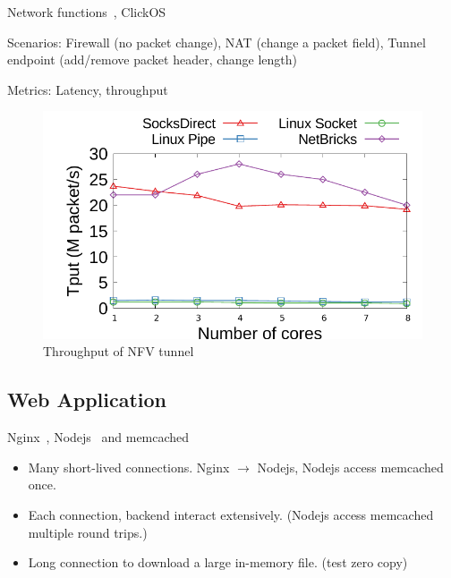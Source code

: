 Network functions~\cite{li2016clicknp}, ClickOS~\cite{martins2014clickos}

Scenarios: Firewall (no packet change), NAT (change a packet field), Tunnel endpoint (add/remove packet header, change length)

Metrics: Latency, throughput

\begin{figure}[htpb]
	\centering
	\includegraphics[width=\columnwidth]{eval/microbenchmark/nfv-tun-tput.pdf}
	\caption{Throughput of NFV tunnel}
	\label{fig:eval-tun-tput}
\end{figure}



\subsection{Web Application}

Nginx~\cite{nginx}, Nodejs~\cite{nodejs} and memcached~\cite{memcached}

\begin{itemize}
	\item Many short-lived connections. Nginx $\rightarrow$ Nodejs, Nodejs access memcached once.
	\item Each connection, backend interact extensively. (Nodejs access memcached multiple round trips.)
	\item Long connection to download a large in-memory file. (test zero copy)
\end{itemize}

